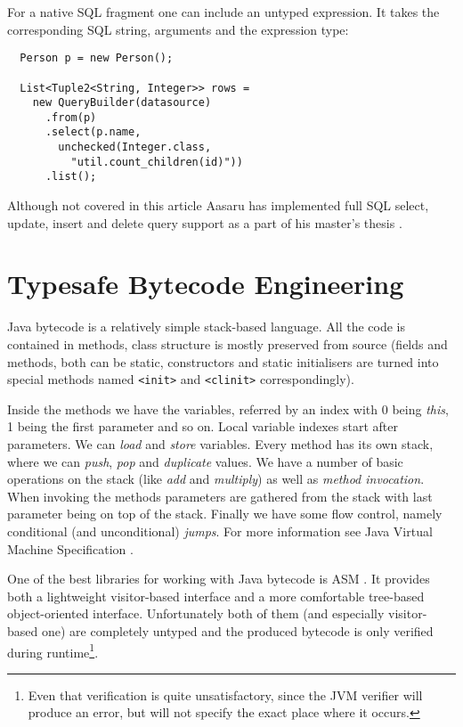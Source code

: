 \documentclass{sig-alternate}
\begin{document}
For a native SQL fragment one can include an untyped expression. It takes the corresponding SQL string, arguments and the expression type:

\begin{verbatim}
  Person p = new Person();

  List<Tuple2<String, Integer>> rows =
    new QueryBuilder(datasource)
      .from(p)
      .select(p.name,
        unchecked(Integer.class,
          "util.count_children(id)"))
      .list();
\end{verbatim}

Although not covered in this article Aasaru has implemented full SQL select, update, insert  and delete query support as a part of his master's thesis \cite{aasaru2008}.

\section{Typesafe Bytecode Engineering}

Java bytecode is a relatively simple stack-based language. All the code is contained in methods, class structure is mostly preserved from source (fields and methods, both can be static, constructors and static initialisers are turned into special methods named \verb!<init>! and \verb!<clinit>! correspondingly). 

Inside the methods we have the variables, referred by an index with $0$ being \emph{this}, 1 being the first parameter and so on. Local variable indexes start after parameters. We can \emph{load} and \emph{store} variables. Every method has its own  stack, where we can \emph{push}, \emph{pop} and \emph{duplicate} values. We have a number of basic operations on the stack (like \emph{add} and \emph{multiply}) as well as \emph{method invocation}. When invoking the methods parameters are gathered from the stack with last parameter being on top of the stack. Finally we have some flow control, namely conditional (and unconditional) \emph{jumps}. For more information see Java Virtual Machine Specification \cite{lindholm1999jvm}.

One of the best libraries for working with Java bytecode is ASM \cite{bruneton2002acm}. It provides both a lightweight visitor-based interface and a more comfortable tree-based object-oriented interface. Unfortunately both of them (and especially visitor-based one) are completely untyped and the produced bytecode is only verified during runtime\footnote{Even that verification is quite unsatisfactory, since the JVM verifier will produce an error, but will not specify the exact place where it occurs.}.
\end{document}
